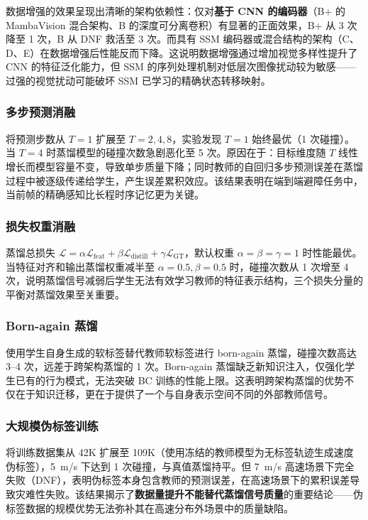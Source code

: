 \documentclass[12pt,a4paper]{article}
\numberwithin{equation}{section}
\numberwithin{figure}{section}
\numberwithin{table}{section}
\begin{document}
数据增强的效果呈现出清晰的架构依赖性：仅对\textbf{基于 CNN 的编码器}（B+ 的 MambaVision 混合架构、B 的深度可分离卷积）有显著的正面效果，B+ 从 3 次降至 1 次，B 从 DNF 救活至 3 次。而具有 SSM 编码器或混合结构的架构（C、D、E）在数据增强后性能反而下降。这说明数据增强通过增加视觉多样性提升了 CNN 的特征泛化能力，但 SSM 的序列处理机制对低层次图像扰动较为敏感——过强的视觉扰动可能破坏 SSM 已学习的精确状态转移映射。

\subsubsection{多步预测消融}

将预测步数从 $T=1$ 扩展至 $T=2,4,8$，实验发现 $T=1$ 始终最优（1 次碰撞）。当 $T=4$ 时蒸馏模型的碰撞次数急剧恶化至 5 次。原因在于：目标维度随 $T$ 线性增长而模型容量不变，导致单步质量下降；同时教师的自回归多步预测误差在蒸馏过程中被逐级传递给学生，产生误差累积效应。该结果表明在端到端避障任务中，当前帧的精确感知比长程时序记忆更为关键。

\subsubsection{损失权重消融}

蒸馏总损失 $\mathcal{L} = \alpha\mathcal{L}_{\text{feat}} + \beta\mathcal{L}_{\text{distill}} + \gamma\mathcal{L}_{\text{GT}}$，默认权重 $\alpha=\beta=\gamma=1$ 时性能最优。当特征对齐和输出蒸馏权重减半至 $\alpha=0.5,\beta=0.5$ 时，碰撞次数从 1 次增至 4 次，说明蒸馏信号减弱后学生无法有效学习教师的特征表示结构，三个损失分量的平衡对蒸馏效果至关重要。

\subsubsection{Born-again 蒸馏}

使用学生自身生成的软标签替代教师软标签进行 born-again 蒸馏，碰撞次数高达 3--4 次，远差于跨架构蒸馏的 1 次。Born-again 蒸馏缺乏新知识注入，仅强化学生已有的行为模式，无法突破 BC 训练的性能上限。这表明跨架构蒸馏的优势不仅在于知识迁移，更在于提供了一个与自身表示空间不同的外部教师信号。

\subsubsection{大规模伪标签训练}

将训练数据集从 42K 扩展至 109K（使用冻结的教师模型为无标签轨迹生成速度伪标签），5~m/s 下达到 1 次碰撞，与真值蒸馏持平。但 7~m/s 高速场景下完全失败（DNF），表明伪标签本身包含教师的预测误差，在高速场景下的累积误差导致灾难性失败。该结果揭示了\textbf{数据量提升不能替代蒸馏信号质量}的重要结论——伪标签数据的规模优势无法弥补其在高速分布外场景中的质量缺陷。
\end{document}
